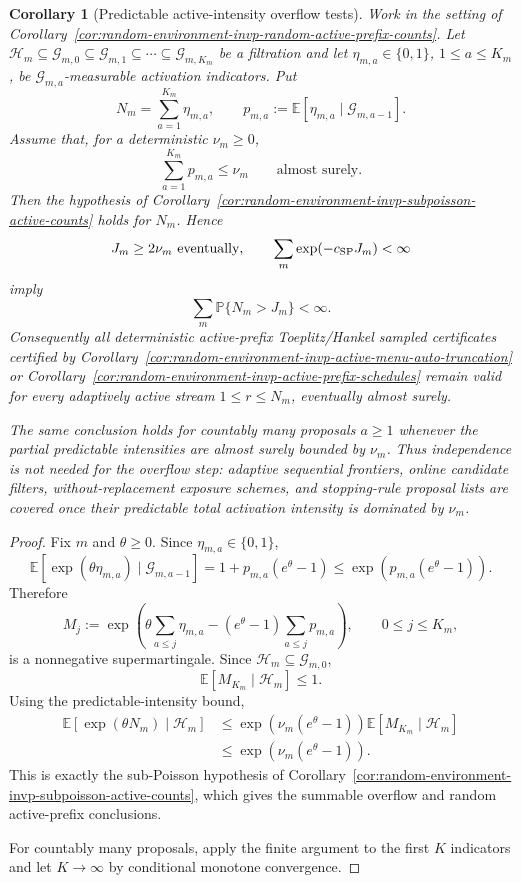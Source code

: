 \documentclass[11pt]{amsart}
\numberwithin{equation}{section}
\newtheorem{corollary}[theorem]{Corollary}
\theoremstyle{definition}
\theoremstyle{remark}
\newcommand{\Prob}{\mathbb P}
\newcommand{\Exp}{\mathbb E}
\begin{document}
\begin{corollary}[Predictable active-intensity overflow tests]
\label{cor:random-environment-invp-predictable-active-intensity}
Work in the setting of
Corollary~\ref{cor:random-environment-invp-random-active-prefix-counts}.  Let
\(\mathcal H_m\subseteq\mathcal G_{m,0}\subseteq\mathcal G_{m,1}\subseteq
\cdots\subseteq\mathcal G_{m,K_m}\) be a filtration and let
\(\eta_{m,a}\in\{0,1\}\), \(1\le a\le K_m\), be
\(\mathcal G_{m,a}\)-measurable activation indicators.  Put
\[
  N_m=\sum_{a=1}^{K_m}\eta_{m,a},
  \qquad
  p_{m,a}:=\Exp[\eta_{m,a}\mid\mathcal G_{m,a-1}].
\]
Assume that, for a deterministic \(\nu_m\ge0\),
\[
  \sum_{a=1}^{K_m}p_{m,a}\le\nu_m
  \qquad\text{almost surely}.
\]
Then the hypothesis of
Corollary~\ref{cor:random-environment-invp-subpoisson-active-counts} holds for
\(N_m\).  Hence
\[
  J_m\ge2\nu_m\ \text{eventually},
  \qquad
  \sum_m\exp(-c_{\rm SP}J_m)<\infty
\]
imply
\[
  \sum_m\Prob\{N_m>J_m\}<\infty .
\]
Consequently all deterministic active-prefix Toeplitz/Hankel sampled
certificates certified by
Corollary~\ref{cor:random-environment-invp-active-menu-auto-truncation} or
Corollary~\ref{cor:random-environment-invp-active-prefix-schedules} remain
valid for every adaptively active stream \(1\le r\le N_m\), eventually almost
surely.

The same conclusion holds for countably many proposals \(a\ge1\) whenever the
partial predictable intensities are almost surely bounded by \(\nu_m\).  Thus
independence is not needed for the overflow step: adaptive sequential
frontiers, online candidate filters, without-replacement exposure schemes, and
stopping-rule proposal lists are covered once their predictable total
activation intensity is dominated by \(\nu_m\).
\end{corollary}

\begin{proof}
Fix \(m\) and \(\theta\ge0\).  Since \(\eta_{m,a}\in\{0,1\}\),
\[
  \Exp[\exp(\theta\eta_{m,a})\mid\mathcal G_{m,a-1}]
  =
  1+p_{m,a}(e^\theta-1)
  \le
  \exp\!\left(p_{m,a}(e^\theta-1)\right).
\]
Therefore
\[
  M_j:=
  \exp\!\left(
    \theta\sum_{a\le j}\eta_{m,a}
    -(e^\theta-1)\sum_{a\le j}p_{m,a}
  \right),
  \qquad 0\le j\le K_m,
\]
is a nonnegative supermartingale.  Since
\(\mathcal H_m\subseteq\mathcal G_{m,0}\),
\[
  \Exp[M_{K_m}\mid\mathcal H_m]\le1 .
\]
Using the predictable-intensity bound,
\[
\begin{aligned}
  \Exp[\exp(\theta N_m)\mid\mathcal H_m]
  &\le
  \exp\!\left(\nu_m(e^\theta-1)\right)
  \Exp[M_{K_m}\mid\mathcal H_m]  \\
  &\le
  \exp\!\left(\nu_m(e^\theta-1)\right).
\end{aligned}
\]
This is exactly the sub-Poisson hypothesis of
Corollary~\ref{cor:random-environment-invp-subpoisson-active-counts}, which
gives the summable overflow and random active-prefix conclusions.

For countably many proposals, apply the finite argument to the first \(K\)
indicators and let \(K\to\infty\) by conditional monotone convergence.
\end{proof}
\end{document}

